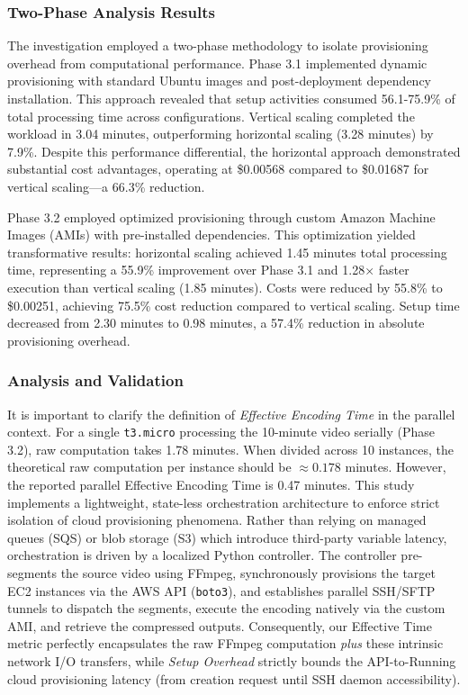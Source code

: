 \documentclass[conference]{IEEEtran}
\begin{document}
	\subsubsection{Two-Phase Analysis Results}
	
	The investigation employed a two-phase methodology to isolate provisioning overhead from computational performance. Phase 3.1 implemented dynamic provisioning with standard Ubuntu images and post-deployment dependency installation. This approach revealed that setup activities consumed 56.1-75.9\% of total processing time across configurations. Vertical scaling completed the workload in 3.04 minutes, outperforming horizontal scaling (3.28 minutes) by 7.9\%. Despite this performance differential, the horizontal approach demonstrated substantial cost advantages, operating at \$0.00568 compared to \$0.01687 for vertical scaling—a 66.3\% reduction.
	
	Phase 3.2 employed optimized provisioning through custom Amazon Machine Images (AMIs) with pre-installed dependencies. This optimization yielded transformative results: horizontal scaling achieved 1.45 minutes total processing time, representing a 55.9\% improvement over Phase 3.1 and 1.28× faster execution than vertical scaling (1.85 minutes). Costs were reduced by 55.8\% to \$0.00251, achieving 75.5\% cost reduction compared to vertical scaling. Setup time decreased from 2.30 minutes to 0.98 minutes, a 57.4\% reduction in absolute provisioning overhead.
	
	\subsubsection{Analysis and Validation}
	
	It is important to clarify the definition of \textit{Effective Encoding Time} in the parallel context. For a single \texttt{t3.micro} processing the 10-minute video serially (Phase 3.2), raw computation takes 1.78 minutes. When divided across 10 instances, the theoretical raw computation per instance should be $\approx 0.178$ minutes. However, the reported parallel Effective Encoding Time is 0.47 minutes. This study implements a lightweight, state-less orchestration architecture to enforce strict isolation of cloud provisioning phenomena. Rather than relying on managed queues (SQS) or blob storage (S3) which introduce third-party variable latency, orchestration is driven by a localized Python controller. The controller pre-segments the source video using FFmpeg, synchronously provisions the target EC2 instances via the AWS API (\texttt{boto3}), and establishes parallel SSH/SFTP tunnels to dispatch the segments, execute the encoding natively via the custom AMI, and retrieve the compressed outputs. Consequently, our Effective Time metric perfectly encapsulates the raw FFmpeg computation \textit{plus} these intrinsic network I/O transfers, while \textit{Setup Overhead} strictly bounds the API-to-Running cloud provisioning latency (from creation request until SSH daemon accessibility).
	
\end{document}
